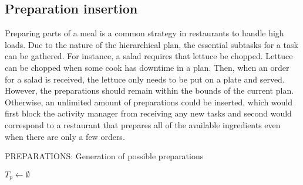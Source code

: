 \subsection{Preparation insertion}
\label{sec:approach-preparation}

Preparing parts of a meal is a common strategy in restaurants to handle high loads.
Due to the nature of the hierarchical plan, the essential subtasks for a task can be gathered.
For instance, a salad requires that lettuce be chopped.  
Lettuce can be chopped when some cook has downtime in a plan.
Then, when an order for a salad is received, the lettuce only needs to be put on a plate and served.
However, the preparations should remain within the bounds of the current plan.
Otherwise, an unlimited amount of preparations could be inserted, which would first block the activity manager from receiving any new tasks and second would correspond to a restaurant that prepares all of the available ingredients even when there are only a few orders.

\begin{algorithm}[t]
    \caption{PREPARATIONS: Generation of possible preparations}
    \label{alg:methodology:preparations}
    $T_p \leftarrow \emptyset$\;
\end{algorithm}

